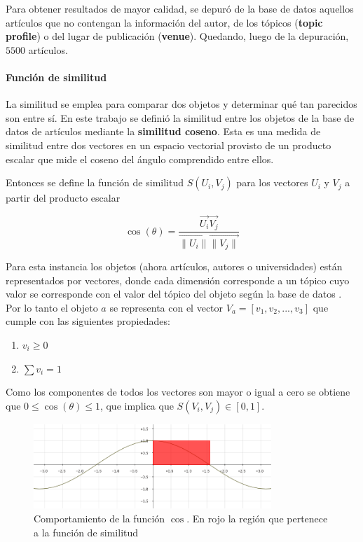 Para obtener resultados de mayor calidad, se depuró de la base de datos aquellos artículos que no contengan la información del autor, de los tópicos (\textbf{topic profile}) o del lugar de publicación (\textbf{venue}). Quedando, luego de la depuración, $5500$ artículos.  

\paragraph{Función de similitud}
La similitud se emplea para comparar dos objetos y determinar qué tan parecidos son entre sí. En este trabajo se definió la similitud entre los objetos de la base de datos de artículos mediante la \textbf{similitud coseno}. Esta es una medida de similitud entre dos vectores en un espacio vectorial provisto de un producto escalar que mide el coseno del ángulo comprendido entre ellos.

Entonces se define la función de similitud $S(U_i, V_j)$ para los vectores $U_i$ y $V_j$ a partir del producto escalar

\begin{equation} \label{eq:angulovectorial}
\cos(\theta) =  \dfrac{\overrightarrow{U_i} \overrightarrow{V_j}}{\overrightarrow{\lVert U_i\lVert} \overrightarrow{\lVert V_j\lVert}}
\end{equation}

Para esta instancia los objetos (ahora artículos, autores o universidades) están representados por vectores, donde cada dimensión corresponde a un tópico cuyo valor se corresponde con el valor del tópico del objeto según la base de datos \cite{dataDrive}. Por lo tanto el objeto $a$ se representa con el vector $V_a = [v_1,v_2,...,v_3]$ que cumple con las siguientes propiedades:
\begin{enumerate}
 \item $v_i \geq 0$
 \item $\sum{v_i} = 1$
\end{enumerate}

Como los componentes de todos los vectores son mayor o igual a cero se obtiene que $0\leq\cos(\theta)\leq1$, que implica que $S(V_i, V_j) \in \left[0, 1\right]$.

\begin{figure}[H]
\includegraphics[width=0.8\textwidth]{img/coseno.png}
\caption{Comportamiento de la función $\cos$. En rojo la región que pertenece a la función de similitud}
\label{bus:img-coseno}
\end{figure}

